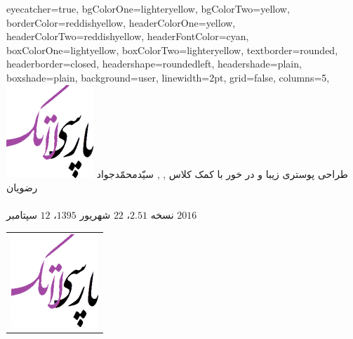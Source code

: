 \documentclass[landscape,debug,paperwidth=1510mm, paperheight=955mm,]{xebaposter}
\begin{document}
      \begin{poster}%
      {
      eyecatcher=true,
      bgColorOne=lighteryellow,%
      bgColorTwo=yellow,
      borderColor=reddishyellow,
      headerColorOne=yellow,
      headerColorTwo=reddishyellow,
      headerFontColor=cyan,
      boxColorOne=lightyellow,      
      boxColorTwo=lighteryellow,
      textborder=rounded,
      headerborder=closed,
      headershape=roundedleft,
      headershade=plain,
      boxshade=plain,
      background=user,
      linewidth=2pt,
      grid=false, %
      columns=5,
      }
 {
      \includegraphics[height=0.05\textheight]{logo}
 }
 {طراحی پوستری زیبا و در خور با کمک کلاس 
}
 {\large {}, , سیّدمحمّدجواد رضویان
 \\%
 {\normalsize\texttt{}
 \\
نسخه $2.51$، $22$ شهریور $1395$، $12$ سپتامبر $2016$
 }}
 {
\begin{tabular}{r}
    \includegraphics[height=0.05 \textheight]{logo}\\
\end{tabular}
 }


\end{poster}
\end{document}
